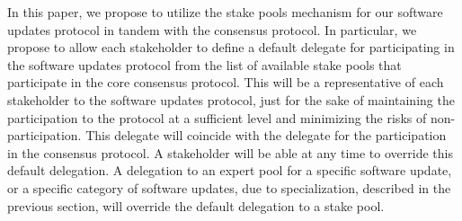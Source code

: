 In this paper, we propose to utilize the stake pools mechanism for our software updates protocol in tandem with the consensus protocol. In particular, we propose to allow each stakeholder to define a default delegate for participating in the software updates protocol from the list of available stake pools that participate in the core consensus protocol. This will be a  representative of each stakeholder to the software updates protocol, just for the sake of maintaining the participation to the protocol at a sufficient level and minimizing the risks of non-participation. This delegate will coincide with the delegate for the participation in the consensus protocol. A stakeholder will be able at any time to override this default delegation. A delegation to an expert pool for a specific software update, or a specific category of software updates, due to specialization, described in the previous section, will override the default delegation to a stake pool.



